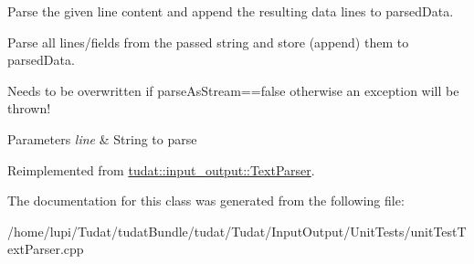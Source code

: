 Parse the given line content and append the resulting data lines to parsed\+Data. 

Parse all lines/fields from the passed string and store (append) them to parsed\+Data.

Needs to be overwritten if parse\+As\+Stream==false otherwise an exception will be thrown!


\begin{DoxyParams}{Parameters}
{\em line} & String to parse \\
\hline
\end{DoxyParams}


Reimplemented from \hyperlink{classtudat_1_1input__output_1_1TextParser_ac0e038fccafbb79ff2d8386f7521999c}{tudat\+::input\+\_\+output\+::\+Text\+Parser}.



The documentation for this class was generated from the following file\+:\begin{DoxyCompactItemize}
\item 
/home/lupi/\+Tudat/tudat\+Bundle/tudat/\+Tudat/\+Input\+Output/\+Unit\+Tests/unit\+Test\+Text\+Parser.\+cpp\end{DoxyCompactItemize}
